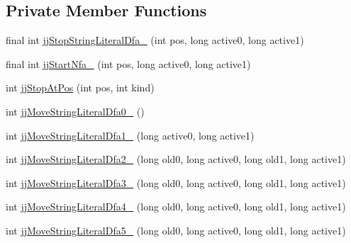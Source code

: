 \subsection*{Private Member Functions}
\begin{DoxyCompactItemize}
\item 
final int \hyperlink{classorg_1_1coode_1_1owlapi_1_1functionalparser_1_1_o_w_l_functional_syntax_parser_token_manager_a33eae5e11ca69a19b8d5cefe4a1a63ac}{jj\-Stop\-String\-Literal\-Dfa\-\_} (int pos, long active0, long active1)
\item 
final int \hyperlink{classorg_1_1coode_1_1owlapi_1_1functionalparser_1_1_o_w_l_functional_syntax_parser_token_manager_a6a10da47c12ee0d7ef4fdfd2f284eeff}{jj\-Start\-Nfa\-\_} (int pos, long active0, long active1)
\item 
int \hyperlink{classorg_1_1coode_1_1owlapi_1_1functionalparser_1_1_o_w_l_functional_syntax_parser_token_manager_a246070f05baf6e6ac302680fab02a3ce}{jj\-Stop\-At\-Pos} (int pos, int kind)
\item 
int \hyperlink{classorg_1_1coode_1_1owlapi_1_1functionalparser_1_1_o_w_l_functional_syntax_parser_token_manager_a387f7ec176472a8999159886218a5be0}{jj\-Move\-String\-Literal\-Dfa0\-\_} ()
\item 
int \hyperlink{classorg_1_1coode_1_1owlapi_1_1functionalparser_1_1_o_w_l_functional_syntax_parser_token_manager_a2335fccedaddae535d2660d31563d54e}{jj\-Move\-String\-Literal\-Dfa1\-\_} (long active0, long active1)
\item 
int \hyperlink{classorg_1_1coode_1_1owlapi_1_1functionalparser_1_1_o_w_l_functional_syntax_parser_token_manager_ad095797921778273cacfd39b12a5a11e}{jj\-Move\-String\-Literal\-Dfa2\-\_} (long old0, long active0, long old1, long active1)
\item 
int \hyperlink{classorg_1_1coode_1_1owlapi_1_1functionalparser_1_1_o_w_l_functional_syntax_parser_token_manager_a538a9e1a8275b73c09f587916a44322b}{jj\-Move\-String\-Literal\-Dfa3\-\_} (long old0, long active0, long old1, long active1)
\item 
int \hyperlink{classorg_1_1coode_1_1owlapi_1_1functionalparser_1_1_o_w_l_functional_syntax_parser_token_manager_a6a76695c3c5e1f9fee584dc88c514ff1}{jj\-Move\-String\-Literal\-Dfa4\-\_} (long old0, long active0, long old1, long active1)
\item 
int \hyperlink{classorg_1_1coode_1_1owlapi_1_1functionalparser_1_1_o_w_l_functional_syntax_parser_token_manager_a5c97183dd8f9d477218a4b00129284c4}{jj\-Move\-String\-Literal\-Dfa5\-\_} (long old0, long active0, long old1, long active1)

\end{DoxyCompactItemize}
